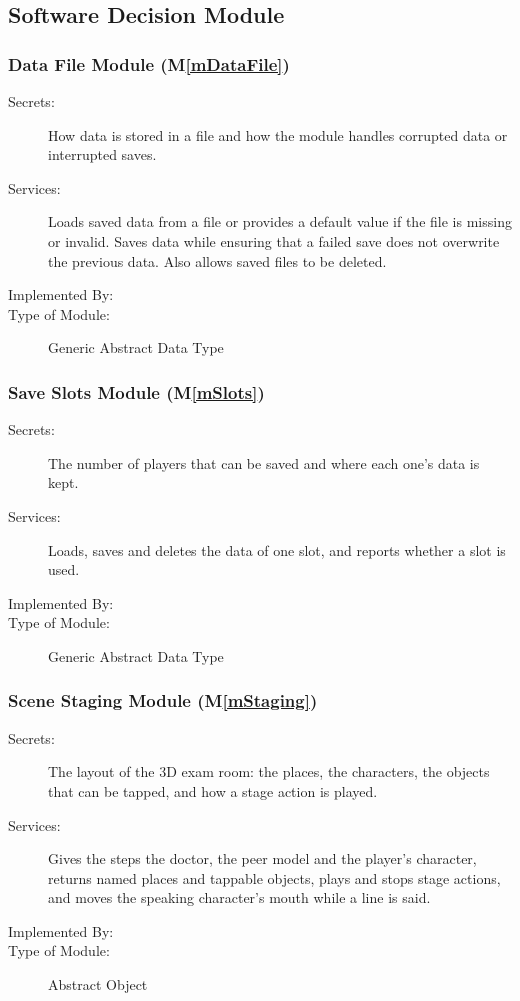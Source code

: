\documentclass[10pt, titlepage]{article}
\newcommand{\mplainref}[1]{M\ref*{#1}}
\begin{document}
\subsection{Software Decision Module}

\subsubsection{Data File Module (\mplainref{mDataFile})}\label{md:mDataFile}

\begin{description}
\item[Secrets:] How data is stored in a file and how the module
  handles corrupted data or interrupted saves.

\item[Services:] Loads saved data from a file or provides a
  default value if the file is missing or invalid. Saves data
  while ensuring that a failed save does not overwrite the
  previous data. Also allows saved files to be deleted.

\item[Implemented By:] \progname{}
\item[Type of Module:] Generic Abstract Data Type
\end{description}

\subsubsection{Save Slots Module (\mplainref{mSlots})}\label{md:mSlots}

\begin{description}
\item[Secrets:] The number of players that can be saved and where each one's
  data is kept.
\item[Services:] Loads, saves and deletes the data of one slot, and reports
  whether a slot is used.
\item[Implemented By:] \progname{}
\item[Type of Module:] Generic Abstract Data Type
\end{description}

\subsubsection{Scene Staging Module (\mplainref{mStaging})}\label{md:mStaging}

\begin{description}
\item[Secrets:] The layout of the 3D exam room: the places, the characters, the
  objects that can be tapped, and how a stage action is played.
\item[Services:] Gives the steps the doctor, the peer model and the player's
  character, returns named places and tappable objects, plays and stops stage
  actions, and moves the speaking character's mouth while a line is said.
\item[Implemented By:] \progname{}
\item[Type of Module:] Abstract Object
\end{description}
\end{document}
